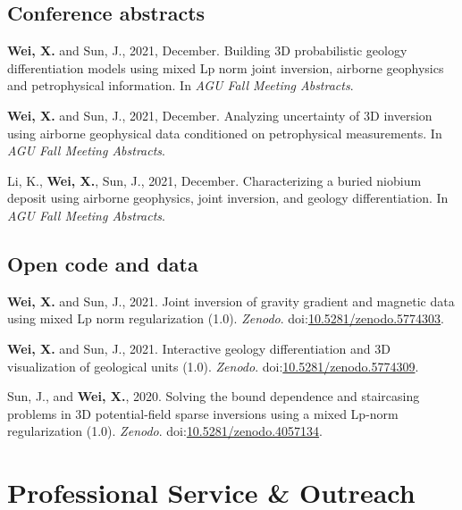 \documentclass[11pt, a4paper]{article}
\newcommand{\LastName}{Wei}
\newcommand{\Initials}{X}
\newcommand{\Wei}{\textbf{\LastName, \Initials.}}  %
\newcommand{\WeiSun}{\textbf{\LastName, \Initials.} and Sun, J.}  %
\newcommand{\DOI}[1]{doi:\href{https://doi.org/#1}{#1}}
\begin{document}
\subsection*{Conference abstracts}
\begin{etaremune}

	\item
	\WeiSun, 2021, December. Building 3D probabilistic geology differentiation models using mixed Lp norm joint inversion, airborne geophysics and petrophysical information. In \emph{AGU Fall Meeting Abstracts}.

	\item
	\WeiSun, 2021, December. Analyzing uncertainty of 3D inversion using airborne geophysical data conditioned on petrophysical measurements. In \emph{AGU Fall Meeting Abstracts}.

	\item
	Li, K., \Wei, Sun, J., 2021, December. Characterizing a buried niobium deposit using airborne geophysics, joint inversion, and geology differentiation. In \emph{AGU Fall Meeting Abstracts}.

\end{etaremune}


\subsection*{Open code and data}
\begin{etaremune}

	\item
	\WeiSun, 2021. Joint inversion of gravity gradient and magnetic data using mixed Lp norm regularization (1.0). \emph{Zenodo}. \DOI{10.5281/zenodo.5774303}.

	\item
	\WeiSun, 2021. Interactive geology differentiation and 3D visualization of geological units (1.0). \emph{Zenodo}. \DOI{10.5281/zenodo.5774309}.

	\item
	Sun, J., and \Wei, 2020. Solving the bound dependence and staircasing problems in 3D potential-field sparse inversions using a mixed Lp-norm regularization (1.0). \emph{Zenodo}. \DOI{10.5281/zenodo.4057134}.

\end{etaremune}



\section*{Professional Service \& Outreach}
\end{document}
